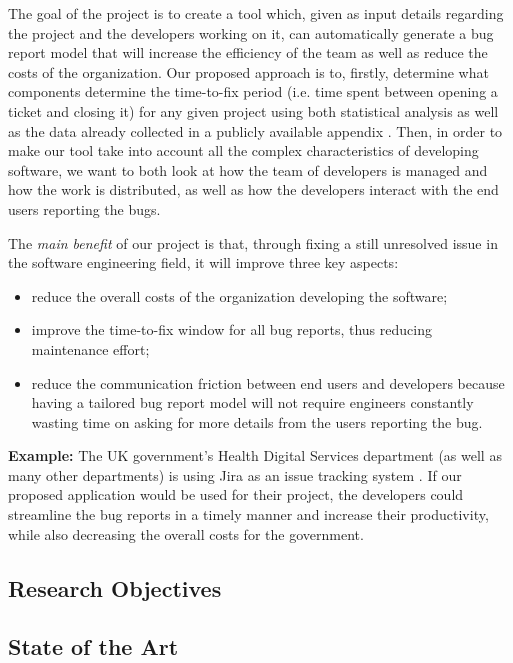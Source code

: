 \documentclass[11pt,english,twocolumn]{article}
\begin{document}
The goal of the project is to create a tool which, given as input details
regarding the project and the developers working on it, can automatically
generate a bug report model that will increase the efficiency of the team
as well as reduce the costs of the organization. Our proposed approach is to,
firstly, determine what components determine the time-to-fix period (i.e. time spent
between opening a ticket and closing it) for any given project using both
statistical analysis as well as the data already collected in a publicly 
available appendix \cite{breu2009appendix}. 
Then, in order to make our tool take into account all the complex characteristics
of developing software, we want to both look at how the team of developers is 
managed and how the work is distributed, as well as how the developers interact
with the end users reporting the bugs.

The \emph{main benefit} of our project is that, through fixing a still
unresolved issue in the software engineering field, it will improve three 
key aspects:

\begin{itemize}
	\item reduce the overall costs of the organization developing the software;
	\item improve the time-to-fix window for all bug reports, thus reducing
	maintenance effort;
	\item reduce the communication friction between end users and developers
	because having a tailored bug report model will not require engineers
	constantly wasting time on asking for more details from the users reporting
	the bug.
\end{itemize}

\textbf{Example:} The UK government's Health Digital Services department (as well
as many other departments) is using Jira as an issue tracking system \cite{gov-uk-jira}. 
If our proposed application would be used for their project, the developers 
could streamline the bug reports in a timely manner and increase their productivity,
while also decreasing the overall costs for the government.

\subsection*{Research Objectives}



\subsection*{State of the Art}
\end{document}

